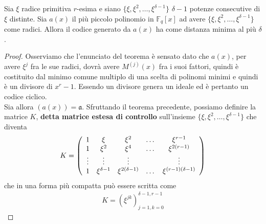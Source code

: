 \begin{teorema}\label{teo:bchDaDelta}
   Sia $\xi$ radice primitiva $r$-esima e siano $\lbrace \xi, \xi^{2}, \dots,\xi^{\delta -1} \rbrace $ $\delta -1$ potenze consecutive di $\xi$ distinte. Sia $a(x)$ il più piccolo polinomio in $\mathbb{F}_{q}[x]$ ad avere  $\lbrace \xi, \xi^{2}, \dots,\xi^{\delta -1} \rbrace $ come radici. Allora il codice generato da $a(x)$ ha come distanza minima al più $\delta$. 
\end{teorema}
\begin{proof}
   Osserviamo che l'enunciato del teorema è sensato dato che $a(x)$, per avere $\xi^{j}$ fra le sue radici, dovrà avere $M^{(j)}(x)$ fra i suoi fattori, quindi è costituito dal minimo comune multiplo di una scelta di polinomi minimi e quindi è un divisore di $x^r - 1$. Essendo un divisore genera un ideale ed è pertanto un codice ciclico.\\
   Sia allora $(a(x)) = \mathfrak{a}$. Sfruttando il teorema precedente, possiamo definire la matrice $K$, {\bf detta matrice estesa di controllo} sull'insieme $\lbrace \xi, \xi^{2}, \dots,\xi^{\delta -1} \rbrace $ che diventa 
   \begin{align*}
        K =
 	\left(
 	\begin{array} {c c c c c}
 	1 & \xi & \xi^{2} & \dots & \xi^{r-1}   \\
        1 & \xi^{2} & \xi^{4} & \dots & \xi^{2(r-1)}   \\
        \vdots & \vdots & \vdots &  & \vdots   \\
        1 & \xi^{\delta -  1}& \xi^{2(\delta -  1)} & \dots & \xi^{(r-1)(\delta -  1)}         
 	\end{array}
 	\right)
     \end{align*}   
   che in una forma più compatta può essere scritta come
   \begin{align*}
        K = (\xi^{jk})_{j=1, k = 0 }^{\delta-1, r-1}
    \end{align*}


\end{proof}
